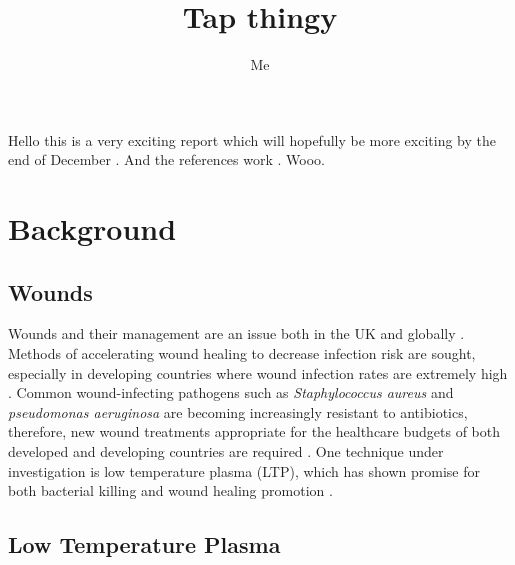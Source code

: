 \documentclass[11pt, oneside]{article}   	%
\title{Tap thingy}
\author{Me}
\begin{document}
\maketitle

Hello this is a very exciting report which will hopefully be more exciting by the end of December \cite{Weltmann2009}. And the references work \cite{Schroter2015atomic}. Wooo.

\section{Background}

\subsection{Wounds}

Wounds and their management are an issue both in the UK and globally \cite{Posnett2008burden}.
Methods of accelerating wound healing to decrease infection risk are sought, especially in developing countries where wound infection rates are extremely high \cite{Kihla2014risk}. 
Common wound-infecting pathogens such as \textit{Staphylococcus aureus} and \textit{pseudomonas aeruginosa} \cite{Church2006burn, Bowler2001wound} are becoming increasingly resistant to antibiotics, therefore, new wound treatments appropriate for the healthcare budgets of both developed and developing countries are required \cite{Chambers2009waves, Godebo2013multidrug, Howell2005a}.
One technique under investigation is low temperature plasma (LTP), which has shown promise for both bacterial killing and wound healing promotion \cite{Kong2009plasma, Kramer2013suitability, Isbary2012successful, Isbary2010a}.


\subsection*{Low Temperature Plasma}
\end{document}
